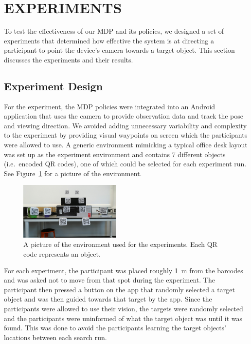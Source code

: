 \documentclass[a4paper, twoside]{article}
\begin{document}
\section{\uppercase{Experiments}}\label{sec:experiments}

\noindent To test the effectiveness of our MDP and its policies, we designed a set of experiments that determined how effective the system is at directing a participant to point the device's camera towards a target object. This section discusses the experiments and their results. 

\subsection{Experiment Design}

\noindent For the experiment, the MDP policies were integrated into an Android application that uses the camera to provide observation data and track the pose and viewing direction. We avoided adding unnecessary variability and complexity to the experiment by providing visual waypoints on screen which the participants were allowed to use. A generic environment mimicking a typical office desk layout was set up as the experiment environment and contains 7 different objects (i.e.\ encoded QR codes), one of which could be selected for each experiment run. See Figure~\ref{fig:env-picture} for a picture of the environment. 

\begin{figure}
  \centering
  \includegraphics[width=0.45\textwidth]{figures/test_env_picture.jpg}
  \caption{A picture of the environment used for the experiments. Each QR code represents an object.}\label{fig:env-picture}
\end{figure}

For each experiment, the participant was placed roughly \SI{1}{\meter} from the barcodes and was asked not to move from that spot during the experiment. The participant then pressed a button on the app that randomly selected a target object and was then guided towards that target by the app. Since the participants were allowed to use their vision, the targets were randomly selected and the participants were uninformed of what the target object was until it was found. This was done to avoid the participants learning the target objects' locations between each search run.
\end{document}
